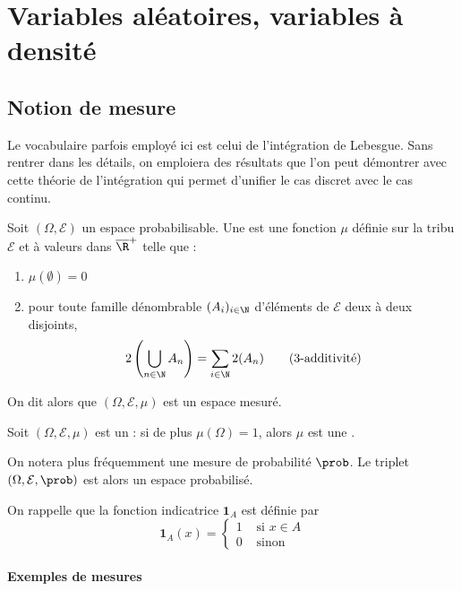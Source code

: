 \section{Variables aléatoires, variables à densité}
\subsection{Notion de mesure}

Le vocabulaire parfois employé ici est celui de l'intégration de Lebesgue. Sans rentrer dans les détails, on emploiera des résultats que l'on peut démontrer avec cette théorie de l'intégration qui permet d'unifier le cas discret avec le cas continu.

\begin{definition}{}{}
	Soit $(\Omega,\mathcal{E})$ un espace probabilisable. Une  est une fonction $\mu$ définie sur la tribu $\mathcal{E}$ et à valeurs dans $\overline{\R}^+$ telle que :
	\begin{enumerate}
		\item $\mu(\emptyset)=0$
		\item  pour toute famille dénombrable $(A_i)_{i \in \N}$ d'éléments de $\mathcal{E}$ deux à deux disjoints,
		$$\mu\left(\bigcup_{n \in \N} A_n \right) = \sum_{i \in \N} \mu(A_n) \qquad \text{($\sigma$-additivité)}$$
	\end{enumerate}
	
	On dit alors que $(\Omega,\mathcal{E},\mu)$ est un espace mesuré.
\end{definition}

\begin{definition}{}{}
	Soit $(\Omega,\mathcal{E},\mu)$ est un  : si de plus $\mu(\Omega)=1$, alors $\mu$ est une . 
	
	On notera plus fréquemment une mesure de probabilité $\prob$. Le triplet $(\Omega,\mathcal{E},\prob)$ est alors un espace probabilisé.
\end{definition}

On rappelle que la fonction indicatrice $\textbf{1}_A$ est définie par 
$$\textbf{1}_A(x)=\begin{cases}
1 & \text{ si } x \in A \\
0 & \text{ sinon }
\end{cases}
$$

\paragraph{Exemples de mesures}




